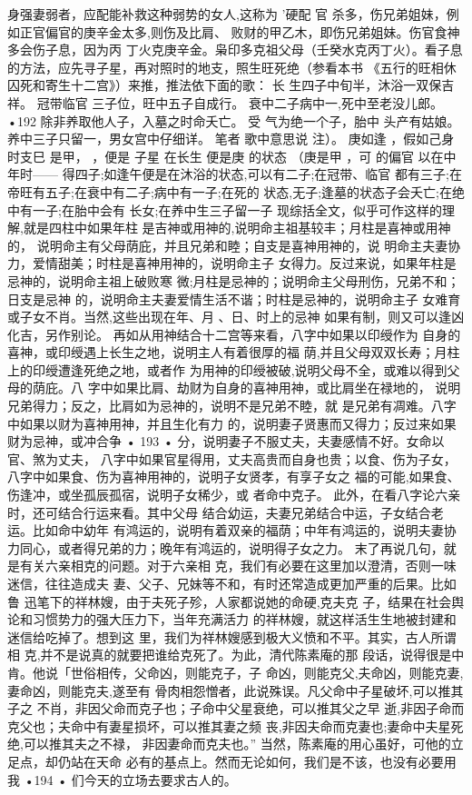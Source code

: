 身强妻弱者，应配能补救这种弱势的女人,这称为 '硬配 官
杀多，伤兄弟姐妹，例如正官偏官的庚辛金太多,则伤及比肩、
败财的甲乙木，即伤兄弟姐妹。伤官食神多会伤子息，因为丙
丁火克庚辛金。枭印多克祖父母（壬癸水克丙丁火）。看子息
的方法，应先寻子星，再对照时的地支，照生旺死绝（参看本书
《五行的旺相休囚死和寄生十二宫》）来推，推法依下面的歌：
长 生四子中旬半，沐浴一双保吉祥。
冠带临官 三子位，旺中五子自成行。
衰中二子病中一,死中至老没儿郎。
•192
除非养取他人子，入墓之时命夭亡。
受 气为绝一个子，胎中 头产有姑娘。
养中三子只留一，男女宫中仔细详。
笔者
歌中意思说
注）。 庚如逢
，假如己身
时支巳
是甲，
，便是
子星
在长生
便是庚
的状态
（庚是甲
，可
的偏官
以在中年时—— 得四子;如逢午便是在沐浴的状态,可以有二子;在冠带、临官
都有三子;在帝旺有五子;在衰中有二子;病中有一子;在死的
状态,无子;逢墓的状态子会夭亡;在绝中有一子;在胎中会有
长女;在养中生三子留一子
现综括全文，似乎可作这样的理解,就是四柱中如果年柱
是吉神或用神的,说明命主祖基较丰；月柱是喜神或用神的，
说明命主有父母荫庇，并且兄弟和睦；自支是喜神用神的，说
明命主夫妻协力，爱情甜美；时柱是喜神用神的，说明命主子
女得力。反过来说，如果年柱是忌神的，说明命主祖上破败寒
微;月柱是忌神的；说明命主父母刑伤，兄弟不和；日支是忌神
的，说明命主夫妻爱情生活不谐；时柱是忌神的，说明命主子
女难育或子女不肖。当然,这些出现在年、月 、日、时上的忌神
如果有制，则又可以逢凶化吉，另作别论。
再如从用神结合十二宫等来看，八字中如果以印绶作为
自身的喜神，或印绶遇上长生之地，说明主人有着很厚的福
荫,并且父母双双长寿；月柱上的印绶遭逢死绝之地，或者作
为用神的印绶被破,说明父母不全，或难以得到父母的荫庇。八
字中如果比肩、劫财为自身的喜神用神，或比肩坐在禄地的，
说明兄弟得力；反之，比肩如为忌神的，说明不是兄弟不睦，就
是兄弟有凋难。八字中如果以财为喜神用神，并且生化有力
的，说明妻子贤惠而又得力；反过来如果财为忌神，或冲合争
• 193 •
分，说明妻子不服丈夫，夫妻感情不好。女命以官、煞为丈夫，
八字中如果官星得用，丈夫高贵而自身也贵；以食、伤为子女，
八字中如果食、伤为喜神用神的，说明子女贤孝，有享子女之
福的可能,如果食、伤逢冲，或坐孤辰孤宿，说明子女稀少，或
者命中克子。
此外，在看八字论六亲时，还可结合行运来看。其中父母
结合幼运，夫妻兄弟结合中运，子女结合老运。比如命中幼年
有鸿运的，说明有着双亲的福荫；中年有鸿运的，说明夫妻协
力同心，或者得兄弟的力；晚年有鸿运的，说明得子女之力。
末了再说几句，就是有关六亲相克的问题。对于六亲相
克，我们有必要在这里加以澄清，否则一味迷信，往往造成夫
妻、父子、兄妹等不和，有时还常造成更加严重的后果。比如鲁
迅笔下的祥林嫂，由于夫死子殄，人家都说她的命硬,克夫克
子，结果在社会舆论和习惯势力的强大压力下，当年充满活力
的祥林嫂，就这样活生生地被封建和迷信给吃掉了。想到这
里，我们为祥林嫂感到极大义愤和不平。其实，古人所谓相
克,并不是说真的就要把谁给克死了。为此，清代陈素庵的那
段话，说得很是中肯。他说「世俗相传，父命凶，则能克子，子
命凶，则能克父,夫命凶，则能克妻,妻命凶，则能克夫,遂至有
骨肉相怨憎者，此说殊误。凡父命中子星破坏,可以推其子之
不肖，非因父命而克子也；子命中父星衰绝，可以推其父之早
逝,非因子命而克父也；夫命中有妻星损坏，可以推其妻之频
丧,非因夫命而克妻也;妻命中夫星死绝,可以推其夫之不禄，
非因妻命而克夫也。”
当然，陈素庵的用心虽好，可他的立足点，却仍站在天命
必有的基点上。然而无论如何，我们是不该，也没有必要用我
•194 •
们今天的立场去要求古人的。

